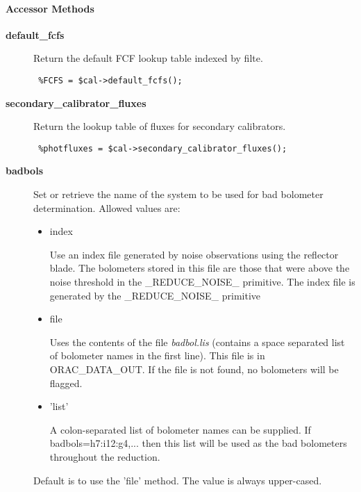 \paragraph*{Accessor Methods\label{ORAC::Calib::SCUBA_Accessor_Methods}}
\begin{description}

\item[{\textbf{default\_fcfs}}] \mbox{}

Return the default FCF lookup table indexed by filte.

\begin{verbatim}
 %FCFS = $cal->default_fcfs();
\end{verbatim}

\item[{\textbf{secondary\_calibrator\_fluxes}}] \mbox{}

Return the lookup table of fluxes for secondary calibrators.

\begin{verbatim}
 %photfluxes = $cal->secondary_calibrator_fluxes();
\end{verbatim}

\item[{\textbf{badbols}}] \mbox{}

Set or retrieve the name of the system to be used for bad bolometer
determination. Allowed values are:

\begin{itemize}

\item index

Use an index file generated by noise observations
using the reflector blade. The bolometers stored in this
file are those that were above the noise threshold in
the \_REDUCE\_NOISE\_ primitive. The index file is generated
by the \_REDUCE\_NOISE\_ primitive


\item file

Uses the contents of the file \emph{badbol.lis} (contains a space
separated list of bolometer names in the first line). This
file is in ORAC\_DATA\_OUT. If the file is not found, no
bolometers will be flagged.


\item 'list'

A colon-separated list of bolometer names can be supplied.
If badbols=h7:i12:g4,... then this list will be used
as the bad bolometers throughout the reduction.

\end{itemize}


Default is to use the 'file' method.
The value is always upper-cased.

\end{description}
